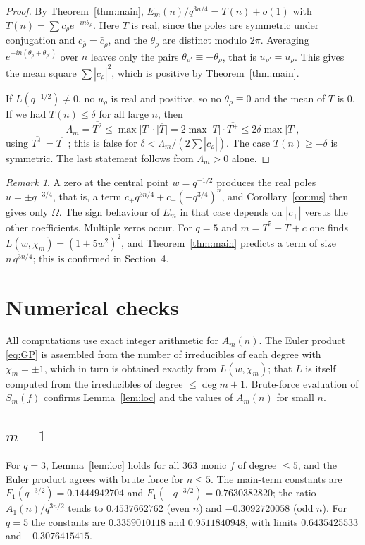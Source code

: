 \documentclass[11pt]{amsart}
\theoremstyle{remark}
\newtheorem{remark}{Remark}
\begin{document}
\begin{proof}
By Theorem~\ref{thm:main}, $E_m(n)/q^{3n/4}=T(n)+o(1)$ with $T(n)=\sum c_\rho e^{-in\theta_\rho}$. Here $T$ is real, since the poles are symmetric under conjugation and $c_{\bar\rho}=\bar c_\rho$, and the $\theta_\rho$ are distinct modulo $2\pi$. Averaging $e^{-in(\theta_\rho+\theta_{\rho'})}$ over $n$ leaves only the pairs $\theta_{\rho'}\equiv-\theta_\rho$, that is $u_{\rho'}=\bar u_\rho$. This gives the mean square $\sum|c_\rho|^2$, which is positive by Theorem~\ref{thm:main}.

If $L(q^{-1/2})\ne0$, no $u_\rho$ is real and positive, so no $\theta_\rho\equiv0$ and the mean of $T$ is $0$. If we had $T(n)\le\delta$ for all large $n$, then
\[
\Lambda_m=\overline{T^2}\le\max|T|\cdot\overline{|T|}=2\max|T|\cdot\overline{T^+}\le2\delta\max|T|,
\]
using $\overline{T^+}=\overline{T^-}$; this is false for $\delta<\Lambda_m/(2\sum|c_\rho|)$. The case $T(n)\ge-\delta$ is symmetric. The last statement follows from $\Lambda_m>0$ alone.
\end{proof}

\begin{remark}
A zero at the central point $w=q^{-1/2}$ produces the real poles $u=\pm q^{-3/4}$, that is, a term $c_+q^{3n/4}+c_-(-q^{3/4})^n$, and Corollary~\ref{cor:ms} then gives only $\Omega$. The sign behaviour of $E_m$ in that case depends on $|c_+|$ versus the other coefficients. Multiple zeros occur. For $q=5$ and $m=T^5+T+c$ one finds $L(w,\chi_m)=(1+5w^2)^2$, and Theorem~\ref{thm:main} predicts a term of size $n\,q^{3n/4}$; this is confirmed in Section~4.
\end{remark}

\section{Numerical checks}

All computations use exact integer arithmetic for $A_m(n)$. The Euler product \eqref{eq:GP} is assembled from the number of irreducibles of each degree with $\chi_m=\pm1$, which in turn is obtained exactly from $L(w,\chi_m)$; that $L$ is itself computed from the irreducibles of degree $\le\deg m+1$. Brute-force evaluation of $S_m(f)$ confirms Lemma~\ref{lem:loc} and the values of $A_m(n)$ for small $n$.

\subsection*{$m=1$}
For $q=3$, Lemma~\ref{lem:loc} holds for all $363$ monic $f$ of degree $\le5$, and the Euler product agrees with brute force for $n\le5$. The main-term constants are $F_1(q^{-3/2})=0.1444942704$ and $F_1(-q^{-3/2})=0.7630382820$; the ratio $A_1(n)/q^{3n/2}$ tends to $0.4537662762$ (even $n$) and $-0.3092720058$ (odd $n$). For $q=5$ the constants are $0.3359010118$ and $0.9511840948$, with limits $0.6435425533$ and $-0.3076415415$.
\end{document}
